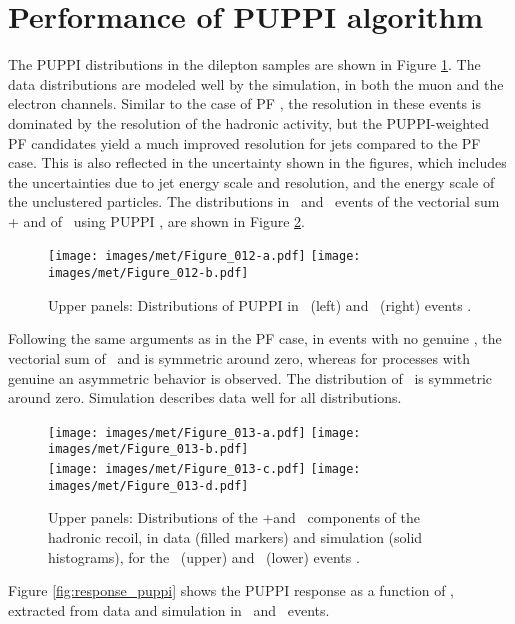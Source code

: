 \section{Performance of PUPPI \ptmiss algorithm}
\noindent\justify
The PUPPI \ptmiss distributions in the dilepton samples are shown in Figure \ref{fig:puppimet}. 
The data distributions are modeled well by the simulation, in both the muon and the electron channels. 
Similar to the case of PF \ptmiss, the \ptmiss resolution in these events is dominated by the resolution of the hadronic activity, 
but the PUPPI-weighted PF candidates yield a much improved resolution for jets compared to the PF case. 
This is also reflected in the uncertainty shown in the figures, which includes the uncertainties due to jet energy scale and resolution, and the energy scale of the unclustered particles. 
The distributions in \Zmm\ and \Zee\ events of the vectorial sum \upar + \qt and of \uperp\, using PUPPI \ptmiss, are shown in Figure \ref{fig:uparuperp_puppi}. 
\begin{figure}[htbp!]
  \centering
  \texttt{[image: images/met/Figure\_012-a.pdf]}
  \texttt{[image: images/met/Figure\_012-b.pdf]}
  \caption{Upper panels: Distributions of PUPPI \ptmiss in \Zmm\ (left) and \Zee\ (right) events \cite{Sirunyan:2019kia}.}
  \label{fig:puppimet}
\end{figure}
\newpara
\noindent\justify
Following the same arguments as in the PF \ptmiss case, in events with no genuine \ptmiss, the vectorial sum of \upar\ and \qt is symmetric around zero, whereas for processes with genuine \ptmiss an asymmetric behavior is observed. 
The distribution of \uperp\ is symmetric around zero. Simulation describes data well for all distributions.
\begin{figure}[htbp!]
  \centering
  \texttt{[image: images/met/Figure\_013-a.pdf]}
  \texttt{[image: images/met/Figure\_013-b.pdf]}\\
  \texttt{[image: images/met/Figure\_013-c.pdf]}
  \texttt{[image: images/met/Figure\_013-d.pdf]}
  \caption{Upper panels: Distributions of the \upar+\qt and \uperp\ components of the hadronic recoil, in data (filled markers) and simulation (solid histograms), for the \Zmm\ (upper) and \Zee\ (lower) events \cite{Sirunyan:2019kia}.} 
  \label{fig:uparuperp_puppi}
\end{figure}
Figure \ref{fig:response_puppi} shows the PUPPI \ptmiss response as a function of \qt, extracted from data and simulation in \Zmm\ and \Zee\ events. 
